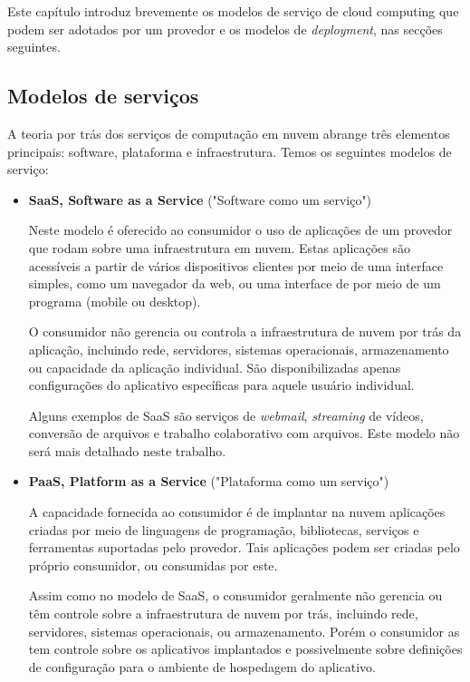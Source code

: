 \documentclass[twosideprint]{politex}
\begin{document}
Este capítulo introduz brevemente os modelos de serviço de cloud computing que podem ser adotados por um provedor e os modelos de \textit{deployment}, nas secções seguintes.

\subsection{Modelos de serviços}

A teoria por trás dos serviços de computação em nuvem abrange três elementos principais: software, plataforma e infraestrutura. Temos os seguintes modelos de serviço:

\begin{itemize}
  \item \textbf{SaaS, Software as a Service} ("Software como um serviço") 

  Neste modelo é oferecido ao consumidor o uso de aplicações de um provedor que rodam sobre uma infraestrutura em nuvem. Estas aplicações são acessíveis a partir de vários dispositivos clientes por meio de uma interface simples, como um navegador da web, ou uma interface de por meio de um programa (mobile ou desktop). 

  O consumidor não gerencia ou controla a infraestrutura de nuvem por trás da aplicação, incluindo rede, servidores, sistemas operacionais, armazenamento ou capacidade da aplicação individual. São disponibilizadas apenas configurações do aplicativo específicas para aquele usuário individual.

  Alguns exemplos de SaaS são serviços de \textit{webmail}, \textit{streaming} de vídeos, conversão de arquivos e trabalho colaborativo com arquivos. Este modelo não será mais detalhado neste trabalho.

  \item \textbf{PaaS, Platform as a Service} ("Plataforma como um serviço") 

  A capacidade fornecida ao consumidor é de implantar na nuvem aplicações criadas por meio de linguagens de programação, bibliotecas, serviços e ferramentas suportadas pelo provedor. Tais aplicações podem ser criadas pelo próprio consumidor, ou consumidas por este.

  Assim como no modelo de SaaS, o consumidor geralmente não gerencia ou têm controle sobre a infraestrutura de nuvem por trás, incluindo rede, servidores, sistemas operacionais, ou armazenamento. Porém o consumidor as tem controle sobre os aplicativos implantados e possivelmente sobre definições de configuração para o ambiente de hospedagem do aplicativo.


\end{itemize}
\end{document}
